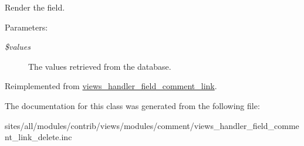 Render the field.

\begin{Desc}
\item[Parameters:]
\begin{description}
\item[{\em \$values}]The values retrieved from the database. \end{description}
\end{Desc}


Reimplemented from \hyperlink{classviews__handler__field__comment__link_c5e8317cc1a0b2a7688f865662b27dae}{views\_\-handler\_\-field\_\-comment\_\-link}.

The documentation for this class was generated from the following file:\begin{CompactItemize}
\item 
sites/all/modules/contrib/views/modules/comment/views\_\-handler\_\-field\_\-comment\_\-link\_\-delete.inc\end{CompactItemize}
